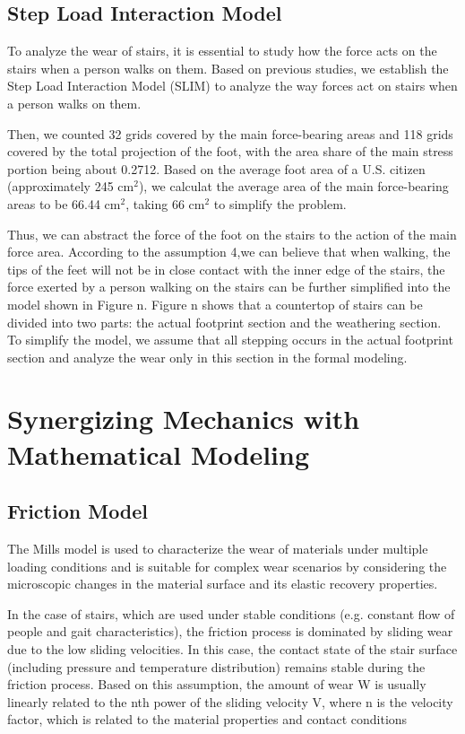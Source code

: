 \documentclass{mcmthesis}
\begin{document}
\subsection{Step Load Interaction Model}
To analyze the wear of stairs, it is essential to study how the force acts on the stairs when a person walks on them. Based on previous studies, we establish the Step Load Interaction Model (SLIM) to analyze the way forces act on stairs when a person walks on them. 
 





Then, we counted 32 grids covered by the main force-bearing areas and 118 grids covered by the total projection of the foot, with the area share of the main stress portion being about 0.2712. Based on the average foot area of a U.S. citizen (approximately 245 cm\(^2\)), we calculat the average area of the main force-bearing areas to be 66.44 cm\(^2\), taking 66 cm\(^2\) to simplify the problem.

Thus, we can abstract the force of the foot on the stairs to the action of the main force area. According to the assumption 4,we can believe that when walking, the tips of the feet will not be in close contact with the inner edge of the stairs, the force exerted by a person walking on the stairs can be further simplified into the model shown in Figure n.
Figure n shows that a countertop of stairs can be divided into two parts: the actual footprint section and the weathering section. To simplify the model, we assume that all stepping occurs in the actual footprint section and analyze the wear only in this section in the formal modeling.
\section{Synergizing Mechanics with Mathematical Modeling}
\subsection{Friction Model}
The Mills model is used to characterize the wear of materials under multiple loading conditions and is suitable for complex wear scenarios by considering the microscopic changes in the material surface and its elastic recovery properties.

In the case of stairs, which are used under stable conditions (e.g. constant flow of people and gait characteristics), the friction process is dominated by sliding wear due to the low sliding velocities. In this case, the contact state of the stair surface (including pressure and temperature distribution) remains stable during the friction process. Based on this assumption, the amount of wear W is usually linearly related to the nth power of the sliding velocity V, where n is the velocity factor, which is related to the material properties and contact conditions%
\end{document}
